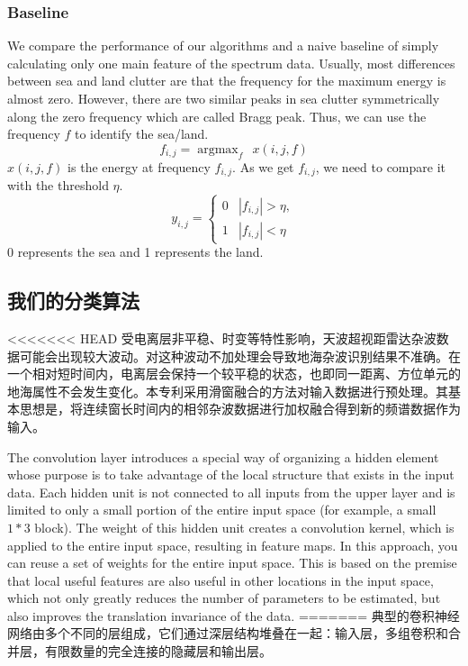 \subsubsection{Baseline}
We compare the performance of our algorithms and a naive baseline of simply calculating only one main feature of the spectrum data. Usually, most differences between sea and land clutter are that the frequency for the maximum energy is almost zero. However, there are two similar peaks in sea clutter symmetrically along the zero frequency which are called Bragg peak. Thus, we can use the frequency $f$ to identify the sea/land.
\begin{equation}
f_{i, j}= \mathop{\arg\max}_{f} \ \ x(i, j, f)
\end{equation}
$x(i, j, f)$ is the energy at frequency $f_{i, j}$. As we get $f_{i, j}$, we need to compare it with the threshold $\eta$.
\[
y_{i, j}= \left\{\begin{array}{ll}
0&|f_{i, j}| > \eta, \\
1&|f_{i, j}| < \eta
\end{array}
\right.\]
0 represents the sea and 1 represents the land.
\subsection{我们的分类算法}

<<<<<<< HEAD
受电离层非平稳、时变等特性影响，天波超视距雷达杂波数据可能会出现较大波动。对这种波动不加处理会导致地海杂波识别结果不准确。在一个相对短时间内，电离层会保持一个较平稳的状态，也即同一距离、方位单元的地海属性不会发生变化。本专利采用滑窗融合的方法对输入数据进行预处理。其基本思想是，将连续窗长时间内的相邻杂波数据进行加权融合得到新的频谱数据作为输入。

The convolution layer introduces a special way of organizing a hidden element whose purpose is to take advantage of the local structure that exists in the input data. Each hidden unit is not connected to all inputs from the upper layer and is limited to only a small portion of the entire input space (for example, a small $1*3$ block). The weight of this hidden unit creates a convolution kernel, which is applied to the entire input space, resulting in feature maps. In this approach, you can reuse a set of weights for the entire input space. This is based on the premise that local useful features are also useful in other locations in the input space, which not only greatly reduces the number of parameters to be estimated, but also improves the translation invariance of the data.
=======
典型的卷积神经网络由多个不同的层组成，它们通过深层结构堆叠在一起：输入层，多组卷积和合并层，有限数量的完全连接的隐藏层和输出层。

